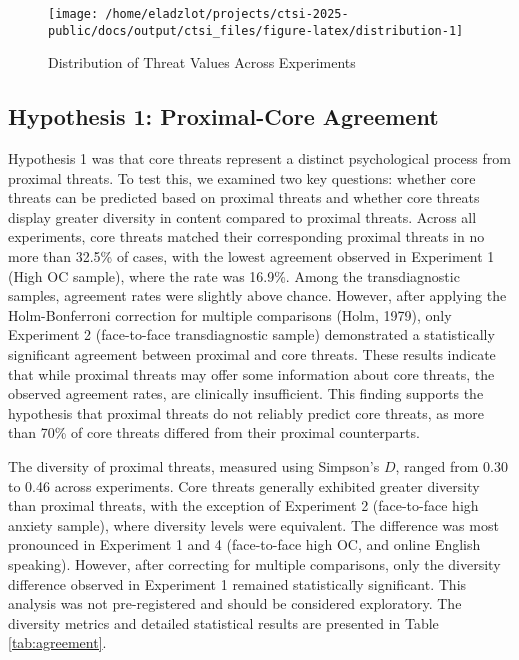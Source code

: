 \documentclass[
  man,floatsintext]{apa7}
\begin{document}
\begin{figure}
\texttt{[image: /home/eladzlot/projects/ctsi-2025-public/docs/output/ctsi\_files/figure-latex/distribution-1]} \caption{Distribution of Threat Values Across Experiments}\label{fig:distribution}
\end{figure}

\subsection{Hypothesis 1: Proximal-Core Agreement}\label{hypothesis-1-proximal-core-agreement}

Hypothesis 1 was that core threats represent a distinct psychological process from proximal threats.
To test this, we examined two key questions: whether core threats can be predicted based on proximal threats and whether core threats display greater diversity in content compared to proximal threats.
Across all experiments, core threats matched their corresponding proximal threats in no more than 32.5\% of cases, with the lowest agreement observed in Experiment 1 (High OC sample), where the rate was 16.9\%.
Among the transdiagnostic samples, agreement rates were slightly above chance.
However, after applying the Holm-Bonferroni correction for multiple comparisons (Holm, 1979), only Experiment 2 (face-to-face transdiagnostic sample) demonstrated a statistically significant agreement between proximal and core threats.
These results indicate that while proximal threats may offer some information about core threats, the observed agreement rates, are clinically insufficient.
This finding supports the hypothesis that proximal threats do not reliably predict core threats, as more than 70\% of core threats differed from their proximal counterparts.

The diversity of proximal threats, measured using Simpson's \(D\), ranged from 0.30 to 0.46 across experiments.
Core threats generally exhibited greater diversity than proximal threats, with the exception of Experiment 2 (face-to-face high anxiety sample), where diversity levels were equivalent.
The difference was most pronounced in Experiment 1 and 4 (face-to-face high OC, and online English speaking).
However, after correcting for multiple comparisons, only the diversity difference observed in Experiment 1 remained statistically significant.
This analysis was not pre-registered and should be considered exploratory.
The diversity metrics and detailed statistical results are presented in Table \ref{tab:agreement}.
\end{document}
